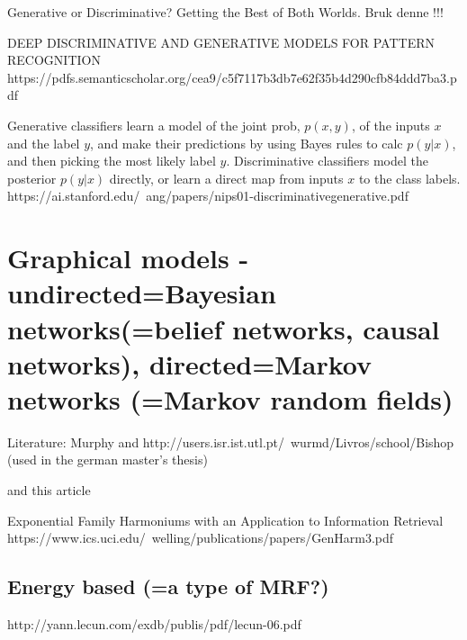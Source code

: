 \documentclass[twoside,english]{uiofysmaster}
\begin{document}
Generative or Discriminative? Getting the Best of Both Worlds. Bruk denne !!!

DEEP DISCRIMINATIVE AND GENERATIVE MODELS FOR PATTERN RECOGNITION
https://pdfs.semanticscholar.org/cea9/c5f7117b3db7e62f35b4d290cfb84ddd7ba3.pdf

Generative classifiers learn a model of the joint prob, $p(x,y)$, of the inputs $x$ and the label $y$, and make their predictions by using Bayes rules to calc $p(y|x)$, and then picking the most likely label $y$. Discriminative classifiers model the posterior $p(y|x)$ directly, or learn a direct map from inputs $x$ to the class labels. 
https://ai.stanford.edu/~ang/papers/nips01-discriminativegenerative.pdf



\section{Graphical models - undirected=Bayesian networks(=belief networks, causal networks), directed=Markov networks (=Markov random fields)}
Literature:
Murphy and
http://users.isr.ist.utl.pt/~wurmd/Livros/school/Bishop%
\cite{Bishop2006} (used in the german master's thesis)

and this article

Exponential Family Harmoniums
with an Application to Information Retrieval
https://www.ics.uci.edu/~welling/publications/papers/GenHarm3.pdf

\subsection{Energy based (=a type of MRF?)}

http://yann.lecun.com/exdb/publis/pdf/lecun-06.pdf
\end{document}
